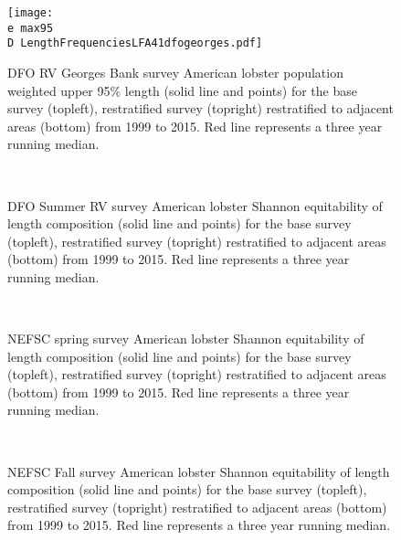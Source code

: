 \documentclass[11pt]{article}
\newcommand{\D}{.}
\newcommand{\e}{/backup/bio_data/bio.lobster/figures/} %
\begin{document}
\begin{figure}

    \texttt{[image: \\e max95\\D LengthFrequenciesLFA41dfogeorges.pdf]}
    \caption{DFO RV Georges Bank survey American lobster population weighted upper 95\% length (solid line and points) for the base survey (topleft), restratified survey (topright) restratified to adjacent areas (bottom) from 1999 to 2015. Red line represents a three year running median.}

\end{figure}






\begin{figure}
\centering
{}
\\
\caption{DFO Summer RV survey American lobster Shannon equitability of length composition (solid line and points) for the base survey (topleft), restratified survey (topright) restratified to adjacent areas (bottom) from 1999 to 2015. Red line represents a three year running median. }
\end{figure}
\clearpage


\begin{figure}
\centering
{}
\\
\caption{NEFSC spring survey American lobster Shannon equitability of length composition  (solid line and points) for the base survey (topleft), restratified survey (topright) restratified to adjacent areas (bottom) from 1999 to 2015. Red line represents a three year running median.}
\end{figure}
\clearpage



\begin{figure}
\centering
{}
\\
\caption{NEFSC Fall survey American lobster Shannon equitability of length composition (solid line and points) for the base survey (topleft), restratified survey (topright) restratified to adjacent areas (bottom) from 1999 to 2015. Red line represents a three year running median.}
\end{figure}
\clearpage
\end{document}
